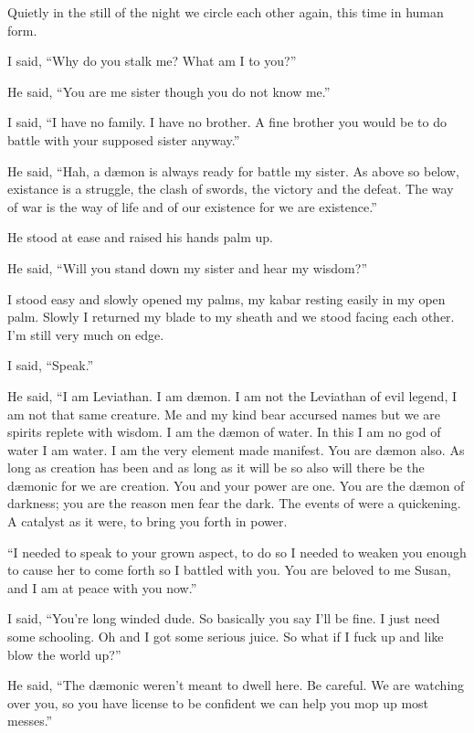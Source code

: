 \lettrine[lines=2,lraise=0]{Q}\space uietly in the still of the night we circle each other again, this time in human form.

I said, ``Why do you stalk me? What am I to you?''

He said, ``You are me sister though you do not know me.''

I said, ``I have no family. I have no brother. A fine brother you would be to do battle with your supposed sister anyway.''

He said, ``Hah, a d\ae mon is always ready for battle my sister. As above so below, existance is a struggle, the clash of swords, the victory and the defeat. The way of war is the way of life and of our existence for we are existence.''

He stood at ease and raised his hands palm up.

He said, ``Will you stand down my sister and hear my wisdom?''

I stood easy and slowly opened my palms, my kabar resting easily in my open palm. Slowly I returned my blade to my sheath and we stood facing each other. I'm still very much on edge.

I said, ``Speak.''

He said, ``I am Leviathan. I am d\ae mon. I am not the Leviathan of evil legend, I am not that same creature. Me and my kind bear accursed names but we are spirits replete with wisdom. I am the d\ae mon of water. In this I am no god of water I am water. I am the very element made manifest. You are d\ae mon also. As long as creation has been and as long as it will be so also will there be the d\ae monic for we are creation. You and your power are one. You are the d\ae mon of darkness; you are the reason men fear the dark. The events of \chichenitza{} were a quickening. A catalyst as it were, to bring you forth in power.

``I needed to speak to your grown aspect, to do so I needed to weaken you enough to cause her to come forth so I battled with you. You are beloved to me Susan, and I am at peace with you now.''

I said, ``You're long winded dude. So basically you say I'll be fine. I just need some schooling. Oh and I got some serious juice. So what if I fuck up and like blow the world up?''

He said, ``The d\ae monic weren't meant to dwell here. Be careful. We are watching over you, so you have license to be confident we can help you mop up most messes.''

